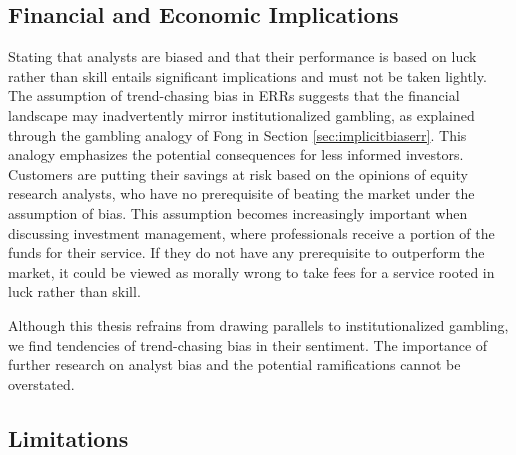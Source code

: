 \subsection{Financial and Economic Implications}





Stating that analysts are biased and that their performance is based on luck rather than skill entails significant implications and must not be taken lightly. The assumption of trend-chasing bias in ERRs suggests that the financial landscape may inadvertently mirror institutionalized gambling, as explained through the gambling analogy of Fong \parencite*{fong2014trend} in Section \ref{sec:implicitbiaserr}. This analogy emphasizes the potential consequences for less informed investors. Customers are putting their savings at risk based on the opinions of equity research analysts, who have no prerequisite of beating the market under the assumption of bias. This assumption becomes increasingly important when discussing investment management, where professionals receive a portion of the funds for their service. If they do not have any prerequisite to outperform the market, it could be viewed as morally wrong to take fees for a service rooted in luck rather than skill.

Although this thesis refrains from drawing parallels to institutionalized gambling, we find tendencies of trend-chasing bias in their sentiment. The importance of further research on analyst bias and the potential ramifications cannot be overstated. 

\subsection{Limitations}


